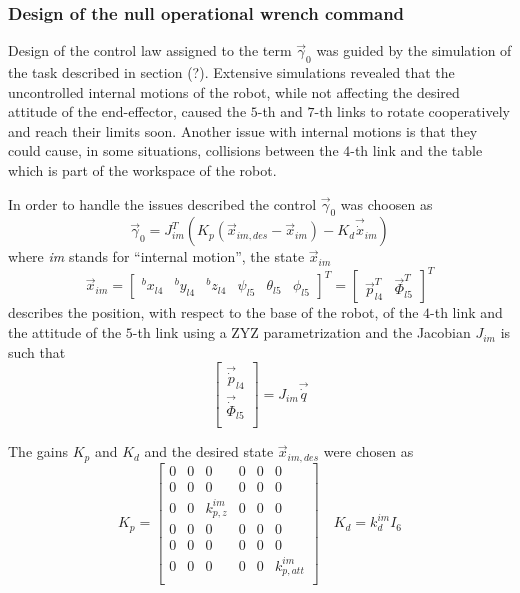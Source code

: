 \subsubsection{Design of the null operational wrench command}
Design of the control law assigned to the term $\vec{\gamma}_{0}$ was
guided by the simulation of the task described in section (?). Extensive simulations
revealed that the uncontrolled internal motions of the robot, while not affecting the desired
attitude of the end-effector, caused the $5$-th and $7$-th links to rotate cooperatively and reach
their limits soon. Another issue with internal motions is that they could cause, in some situations,
collisions between the $4$-th link and the table which is part of the workspace of the robot.
\par
In order to handle the issues described the control $\vec{\gamma}_0$ was choosen as
\begin{equation*}
  \vec{\gamma}_{0} = J_{im} ^{T} (K_p (\vec{x}_{im,des} - \vec{x}_{im} ) - K_d \vec{\dot{x}}_{im})
\end{equation*}
where \emph{im} stands for ``internal motion'', the state $\vec{x}_{im}$
\begin{equation*}
  \vec{x}_{im} =
  \begin{bmatrix}
    {}^{b} x_{l4} & {}^{b} y_{l4} & {}^{b} z_{l4} & \psi_{l5} & \theta_{l5} & \phi_{l5}
  \end{bmatrix}^{T} =
    \begin{bmatrix}
    \vec{p}^{T}_{l4} & \vec{\Phi}^{T}_{l5}
  \end{bmatrix}^{T}
\end{equation*}
describes the position, with respect to the base of the robot, of the $4$-th link
and the attitude of the $5$-th link using a ZYZ parametrization and the Jacobian
$J_{im}$ is such that
\begin{equation*}
  \begin{bmatrix}
    \vec{\dot{p}}_{l4} \\
    \vec{\dot{\Phi}}_{l5} \\
  \end{bmatrix} =
  J_{im} \vec{\dot{q}}
\end{equation*}
\par
The gains $K_p$ and $K_d$ and the desired state $\vec{x}_{im,des}$ were chosen as
\begin{equation*}
  K_p =
  \begin{bmatrix}
    0 & 0 & 0 & 0 & 0 & 0\\
    0 & 0 & 0 & 0 & 0 & 0\\
    0 & 0 & k_{p,z}^{im} & 0 & 0 & 0\\
    0 & 0 & 0 & 0 & 0 & 0\\
    0 & 0 & 0 & 0 & 0 & 0\\
    0 & 0 & 0 & 0 & 0 & k_{p, att}^{im}\\
  \end{bmatrix}
  \quad
  K_d = k_{d}^{im} I_{6}
\end{equation*}
